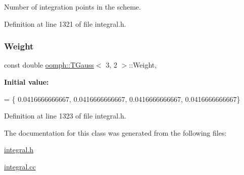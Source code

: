 Number of integration points in the scheme. 



Definition at line 1321 of file integral.\+h.

\mbox{\label{classoomph_1_1TGauss_3_013_00_012_01_4_ada8fc48ffabeddd59812d0f7b98b818f}} 
\subsubsection{\texorpdfstring{Weight}{Weight}}
{\footnotesize\ttfamily const double \hyperlink{classoomph_1_1TGauss}{oomph\+::\+T\+Gauss}$<$ 3, 2 $>$\+::Weight\hspace{0.3cm}{\ttfamily [static]}, {\ttfamily [private]}}

{\bfseries Initial value\+:}
\begin{DoxyCode}
= \{
0.0416666666667,
0.0416666666667,
0.0416666666667,
0.0416666666667\}
\end{DoxyCode}


Definition at line 1323 of file integral.\+h.



The documentation for this class was generated from the following files\+:\begin{DoxyCompactItemize}
\item 
\hyperlink{integral_8h}{integral.\+h}\item 
\hyperlink{integral_8cc}{integral.\+cc}\end{DoxyCompactItemize}
